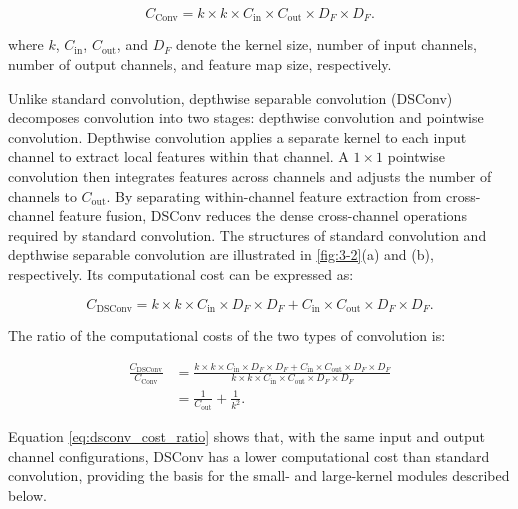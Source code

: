 \begin{equation}
C_{\mathrm{Conv}}
=
k\times k\times C_{\mathrm{in}}\times C_{\mathrm{out}}\times D_F\times D_F.
\label{eq:conv_cost}
\end{equation}

where $k$, $C_{\mathrm{in}}$, $C_{\mathrm{out}}$, and $D_F$ denote the kernel size, number of input channels, number of output channels, and feature map size, respectively.

Unlike standard convolution, depthwise separable convolution (DSConv) decomposes convolution into two stages: depthwise convolution and pointwise convolution\cite{ref71}. Depthwise convolution applies a separate kernel to each input channel to extract local features within that channel. A $1\times1$ pointwise convolution then integrates features across channels and adjusts the number of channels to $C_{\mathrm{out}}$. By separating within-channel feature extraction from cross-channel feature fusion, DSConv reduces the dense cross-channel operations required by standard convolution. The structures of standard convolution and depthwise separable convolution are illustrated in \cref{fig:3-2}(a) and (b), respectively. Its computational cost can be expressed as:

\begin{equation}
C_{\mathrm{DSConv}}
=
k\times k\times C_{\mathrm{in}}\times D_F\times D_F
+
C_{\mathrm{in}}\times C_{\mathrm{out}}\times D_F\times D_F.
\label{eq:dsconv_cost}
\end{equation}

The ratio of the computational costs of the two types of convolution is:

\begin{equation}
\begin{aligned}
\frac{C_{\mathrm{DSConv}}}{C_{\mathrm{Conv}}}
&=
\frac{
k\times k\times C_{\mathrm{in}}\times D_F\times D_F
+
C_{\mathrm{in}}\times C_{\mathrm{out}}\times D_F\times D_F
}{
k\times k\times C_{\mathrm{in}}\times C_{\mathrm{out}}\times D_F\times D_F
} \\
&=
\frac{1}{C_{\mathrm{out}}}
+
\frac{1}{k^2}.
\end{aligned}
\label{eq:dsconv_cost_ratio}
\end{equation}

Equation \eqref{eq:dsconv_cost_ratio} shows that, with the same input and output channel configurations, DSConv has a lower computational cost than standard convolution, providing the basis for the small- and large-kernel modules described below.

